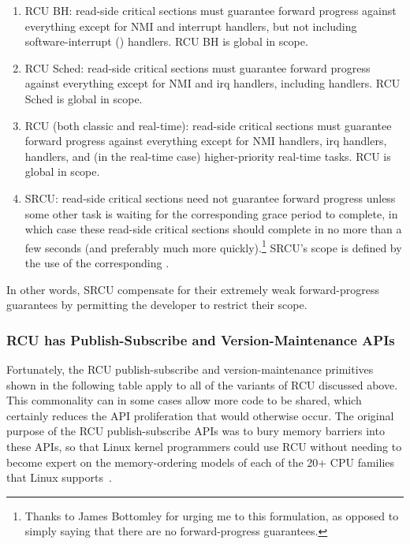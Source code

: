 \begin{enumerate}
\item	RCU BH: read-side critical sections
	must guarantee forward progress against everything except for
	NMI and interrupt handlers, but not including software-interrupt
	() handlers.
	RCU BH is global in scope.
\item	RCU Sched: read-side critical sections must guarantee forward
	progress against everything except for NMI and irq handlers,
	including  handlers.
	RCU Sched is global in scope.
\item	RCU (both classic and real-time): read-side critical sections
	must guarantee forward progress against everything except for
	NMI handlers, irq handlers,  handlers, and (in the
	real-time case) higher-priority real-time tasks.
	RCU is global in scope.
\item	SRCU: read-side critical sections need not guarantee
	forward progress unless some other task is waiting for the
	corresponding grace period to complete, in which case these
	read-side critical sections should complete in no more than
	a few seconds (and preferably much more quickly).\footnote{
		Thanks to James Bottomley for urging me to this
		formulation, as opposed to simply saying that
		there are no forward-progress guarantees.}
	SRCU's scope is defined by the use of the corresponding
	.
\end{enumerate}

In other words, SRCU compensate for their extremely weak
forward-progress guarantees by permitting the developer to restrict
their scope.

\subsubsection{RCU has Publish-Subscribe and Version-Maintenance APIs}
\label{sec:defer:RCU has Publish-Subscribe and Version-Maintenance APIs}

Fortunately, the RCU publish-subscribe and version-maintenance
primitives shown in the following
table apply to all of the variants of RCU discussed above.
This commonality can in some cases allow more code to be shared,
which certainly reduces the API proliferation that would otherwise
occur.
The original purpose of the RCU publish-subscribe APIs was to
bury memory barriers into these APIs, so that Linux kernel
programmers could use RCU without needing to become expert on
the memory-ordering models of each of the 20+ CPU families
that Linux supports~\cite{Spraul01}.

